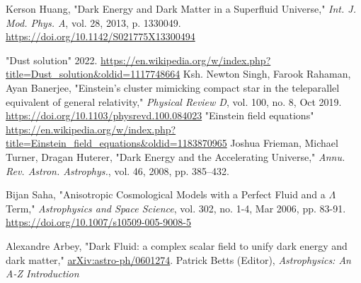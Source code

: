 \documentclass{sciposter}
\begin{document}
\begin{multicols}{3}
\begin{thebibliography}{1}
Kerson Huang, "Dark Energy and Dark Matter in a Superfluid Universe," \textit{Int. J. Mod. Phys. A}, vol. 28, 2013, p. 1330049. 
\url{https://doi.org/10.1142/S021775X13300494}

"Dust solution" 2022.
\url{https://en.wikipedia.org/w/index.php?title=Dust_solution&oldid=1117748664}
Ksh. Newton Singh, Farook Rahaman, Ayan Banerjee, "Einstein's cluster mimicking compact star in the teleparallel equivalent of general relativity," \textit{Physical Review D}, vol. 100, no. 8, Oct 2019.
\url{https://doi.org/10.1103/physrevd.100.084023}
"Einstein field equations"
\url{https://en.wikipedia.org/w/index.php?title=Einstein_field_equations&oldid=1183870965}
Joshua Frieman, Michael Turner, Dragan Huterer, "Dark Energy and the Accelerating Universe," \textit{Annu. Rev. Astron. Astrophys.}, vol. 46, 2008, pp. 385–432.

Bijan Saha, "Anisotropic Cosmological Models with a Perfect Fluid and a $\Lambda$ Term," \textit{Astrophysics and Space Science}, vol. 302, no. 1-4, Mar 2006, pp. 83-91.
\url{https://doi.org/10.1007/s10509-005-9008-5}

Alexandre Arbey, "Dark Fluid: a complex scalar field to unify dark energy and dark matter," \url{arXiv:astro-ph/0601274}.
Patrick Betts (Editor), \textit{Astrophysics: An A-Z Introduction}

\end{thebibliography}

\end{multicols}
\end{document}
